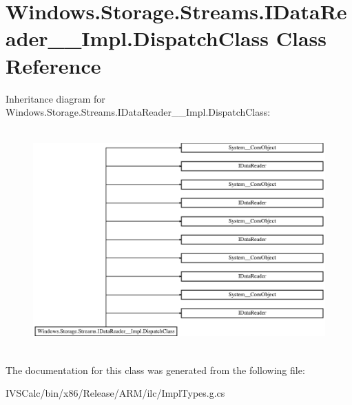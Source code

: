 \hypertarget{class_windows_1_1_storage_1_1_streams_1_1_i_data_reader_____impl_1_1_dispatch_class}{}\section{Windows.\+Storage.\+Streams.\+I\+Data\+Reader\+\_\+\+\_\+\+Impl.\+Dispatch\+Class Class Reference}
\label{class_windows_1_1_storage_1_1_streams_1_1_i_data_reader_____impl_1_1_dispatch_class}
Inheritance diagram for Windows.\+Storage.\+Streams.\+I\+Data\+Reader\+\_\+\+\_\+\+Impl.\+Dispatch\+Class\+:\begin{figure}[H]
\begin{center}
\leavevmode
\includegraphics[height=8.531857cm]{class_windows_1_1_storage_1_1_streams_1_1_i_data_reader_____impl_1_1_dispatch_class}
\end{center}
\end{figure}


The documentation for this class was generated from the following file\+:\begin{DoxyCompactItemize}
\item 
I\+V\+S\+Calc/bin/x86/\+Release/\+A\+R\+M/ilc/Impl\+Types.\+g.\+cs\end{DoxyCompactItemize}

